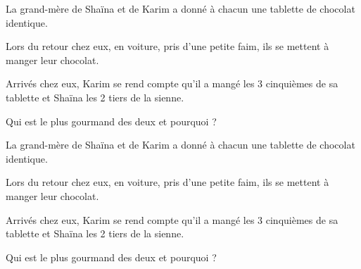 \documentclass[a4paper]{book}
\begin{document}
\newcommand{\monTitre}{Les fractions}

\setcounter{exo}{1}
\enteteActivite{6}{\monTitre}{\thechapter}

    \begin{exercice}
        La grand-mère de Shaïna et de Karim a donné à chacun une tablette de chocolat identique.
           
        Lors du retour chez eux, en voiture, pris d'une petite faim, ils se mettent à manger leur chocolat.
    
        Arrivés chez eux, Karim se rend compte qu'il a mangé les 3 cinquièmes de sa tablette et Shaïna les 2 tiers de la sienne.
        
        Qui est le plus gourmand des deux et pourquoi ?
    \end{exercice}

    \begin{center}
    \end{center}

\bigskip
        

        \begin{exercice}
        La grand-mère de Shaïna et de Karim a donné à chacun une tablette de chocolat identique.
           
        Lors du retour chez eux, en voiture, pris d'une petite faim, ils se mettent à manger leur chocolat.
    
        Arrivés chez eux, Karim se rend compte qu'il a mangé les 3 cinquièmes de sa tablette et Shaïna les 2 tiers de la sienne.
        
        Qui est le plus gourmand des deux et pourquoi ?
    \end{exercice}

    \begin{center}
    \end{center}
\end{document}
